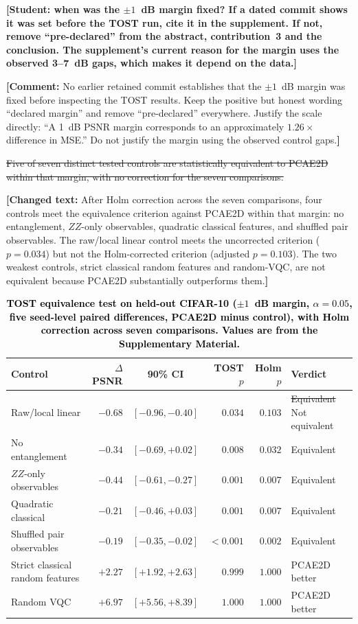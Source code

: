 \documentclass[pdflatex,sn-basic]{sn-jnl}
\newcommand{\del}[1]{\sout{#1}}
\newcommand{\add}[1]{\textbf{\textcolor{black}{#1}}}
\newcommand{\yellowinline}[1]{\begingroup\setlength{\fboxsep}{2pt}\colorbox{yellow!35}{#1}\endgroup}
\newcommand{\yellowchange}[1]{%
  \par\smallskip\noindent
  \begingroup\setlength{\fboxsep}{3pt}%
  \colorbox{yellow!35}{\parbox{\dimexpr\linewidth-2\fboxsep\relax}{\textbf{[Changed text:} #1\textbf{]}}}%
  \endgroup\par\smallskip}
\newcommand{\yellowcomment}[1]{%
  \par\smallskip\noindent
  \begingroup\setlength{\fboxsep}{3pt}%
  \colorbox{yellow!35}{\parbox{\dimexpr\linewidth-2\fboxsep\relax}{\textbf{[Comment:} #1\textbf{]}}}%
  \endgroup\par\smallskip}
\begin{document}
{\color{red}\textbf{[Student: when was the $\pm1$~dB margin fixed? If a dated
commit shows it was set before the TOST run, cite it in the supplement. If not,
remove ``pre-declared'' from the abstract, contribution~3 and the conclusion.
The supplement's current reason for the margin uses the observed 3--7~dB gaps,
which makes it depend on the data.]}}
\yellowcomment{No earlier retained commit establishes that the $\pm1$~dB margin was fixed before inspecting the TOST results. Keep the positive but honest wording ``declared margin'' and remove ``pre-declared'' everywhere. Justify the scale directly: ``A 1~dB PSNR margin corresponds to an approximately $1.26\times$ difference in MSE.'' Do not justify the margin using the observed control gaps.}

\del{Five of seven distinct tested controls are statistically equivalent to
PCAE2D within that margin, with no correction for the seven comparisons.}
\yellowchange{After Holm correction across the seven comparisons, four controls
meet the equivalence criterion against PCAE2D within that margin: no
entanglement, $ZZ$-only observables, quadratic classical features, and shuffled
pair observables. The raw/local linear control meets the uncorrected criterion
($p=0.034$) but not the Holm-corrected criterion (adjusted $p=0.103$). The two
weakest controls, strict classical random features and random-VQC, are not
equivalent because PCAE2D substantially outperforms them.}
\begin{table}[t]
  \centering
  \caption[TOST equivalence test on held-out CIFAR-10]{\add{TOST equivalence
           test on held-out CIFAR-10 ($\pm1$~dB margin, $\alpha=0.05$, five
           seed-level paired differences, PCAE2D minus control), with Holm
           correction across seven comparisons. Values are from the
           Supplementary Material.}}
  \label{tab:tost_main}
  \footnotesize\bfseries
  \setlength{\tabcolsep}{2.5pt}
  \begin{tabular}{@{}l r c r r l@{}}
    \toprule
    Control & $\Delta$PSNR & 90\% CI & TOST $p$ & \yellowinline{Holm $p$} & Verdict \\
    \midrule
    Raw/local linear & $-0.68$ & $[-0.96,-0.40]$ & $0.034$ & \yellowinline{$0.103$} & \del{Equivalent} \yellowinline{Not equivalent} \\
    No entanglement & $-0.34$ & $[-0.69,+0.02]$ & $0.008$ & \yellowinline{$0.032$} & Equivalent \\
    $ZZ$-only observables & $-0.44$ & $[-0.61,-0.27]$ & $0.001$ & \yellowinline{$0.007$} & Equivalent \\
    Quadratic classical & $-0.21$ & $[-0.46,+0.03]$ & $0.001$ & \yellowinline{$0.007$} & Equivalent \\
    Shuffled pair observables & $-0.19$ & $[-0.35,-0.02]$ & $<0.001$ & \yellowinline{$0.002$} & Equivalent \\
    Strict classical random features & $+2.27$ & $[+1.92,+2.63]$ & $0.999$ & \yellowinline{$1.000$} & PCAE2D better \\
    Random VQC & $+6.97$ & $[+5.56,+8.39]$ & $1.000$ & \yellowinline{$1.000$} & PCAE2D better \\
    \bottomrule
  \end{tabular}
\end{table}
\end{document}
